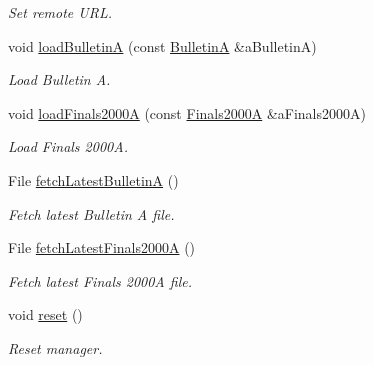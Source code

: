 \begin{DoxyCompactItemize}
\begin{DoxyCompactList}\small\item\em Set remote U\+RL. \end{DoxyCompactList}\item 
void \hyperlink{classlibrary_1_1physics_1_1coord_1_1frame_1_1provider_1_1iers_1_1_manager_a7842650adf502ff5de1889bb6301c319}{load\+BulletinA} (const \hyperlink{classlibrary_1_1physics_1_1coord_1_1frame_1_1provider_1_1iers_1_1_bulletin_a}{BulletinA} \&a\+BulletinA)
\begin{DoxyCompactList}\small\item\em Load Bulletin A. \end{DoxyCompactList}\item 
void \hyperlink{classlibrary_1_1physics_1_1coord_1_1frame_1_1provider_1_1iers_1_1_manager_a7ac485b75d2e7e381bf90803564b2206}{load\+Finals2000A} (const \hyperlink{classlibrary_1_1physics_1_1coord_1_1frame_1_1provider_1_1iers_1_1_finals2000_a}{Finals2000A} \&a\+Finals2000A)
\begin{DoxyCompactList}\small\item\em Load Finals 2000A. \end{DoxyCompactList}\item 
File \hyperlink{classlibrary_1_1physics_1_1coord_1_1frame_1_1provider_1_1iers_1_1_manager_aebd629476fc4a74bcdbacdc006cb137f}{fetch\+Latest\+BulletinA} ()
\begin{DoxyCompactList}\small\item\em Fetch latest Bulletin A file. \end{DoxyCompactList}\item 
File \hyperlink{classlibrary_1_1physics_1_1coord_1_1frame_1_1provider_1_1iers_1_1_manager_afe61163d199c705387baafae88669a3f}{fetch\+Latest\+Finals2000A} ()
\begin{DoxyCompactList}\small\item\em Fetch latest Finals 2000A file. \end{DoxyCompactList}\item 
void \hyperlink{classlibrary_1_1physics_1_1coord_1_1frame_1_1provider_1_1iers_1_1_manager_a9f33e958715ef7af62a91aa54789e78a}{reset} ()
\begin{DoxyCompactList}\small\item\em Reset manager. \end{DoxyCompactList}\end{DoxyCompactItemize}
